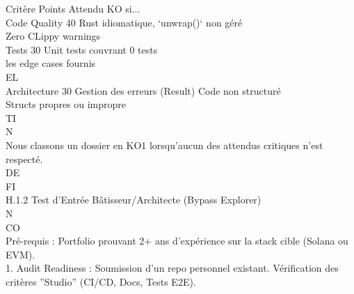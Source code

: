 \vspace{0.5em}
Critère                                        Points         Attendu                                               KO si...\\
Code Quality                                     40           Rust idiomatique,                                     ‘unwrap()‘ non géré\\
Zero CLippy warnings\\
Tests                                            30           Unit tests couvrant                                   0 tests\\
les edge cases                                        fournis\\
\vspace{0.5em}
\vspace{0.5em}
\vspace{0.5em}
\vspace{0.5em}
EL\\
Architecture                                     30           Gestion des erreurs (Result)                          Code non structuré\\
Structs propres                                       ou impropre\\
\vspace{0.5em}
\vspace{0.5em}
\vspace{0.5em}
\vspace{0.5em}
TI\\
N\\
Nous classons un dossier en KO1 lorsqu’aucun des attendus critiques n’est respecté.\\
\vspace{0.5em}
\vspace{0.5em}
\vspace{0.5em}
\vspace{0.5em}
DE\\
FI\\
H.1.2 Test d’Entrée Bâtisseur/Architecte (Bypass Explorer)\\
\vspace{0.5em}
\vspace{0.5em}
N\\
CO\\
Pré-requis : Portfolio prouvant 2+ ans d’expérience sur la stack cible (Solana ou EVM).\\
\vspace{0.5em}
1. Audit Readiness : Soumission d’un repo personnel existant. Vérification des critères ”Studio” (CI/CD, Docs, Tests E2E).\\

